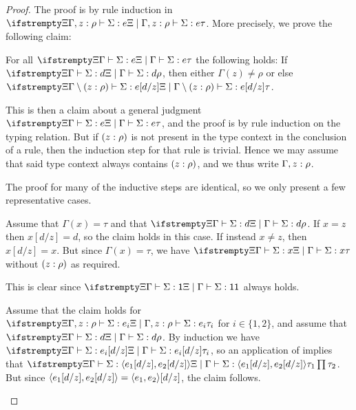 \begin{proof}
The proof is by rule induction in $\typerel{\Xi}{\Gamma, \hastype{z}{\rho}}{\Sigma}{e}{\tau}$. More precisely, we prove the following claim:
%
\begin{displaytheorem}
    For all $\typerel{\Xi}{\Gamma}{\Sigma}{e}{\tau}$ the following holds: If $\typerel{\Xi}{\Gamma}{\Sigma}{d}{\rho}$, then either $\Gamma(z) \neq \rho$ or else $\typerel{\Xi}{\Gamma \setminus \hastype*{z}{\rho}}{\Sigma}{e[d/z]}{\tau}$.
\end{displaytheorem}
%
This is then a claim about a general judgment $\typerel{\Xi}{\Gamma}{\Sigma}{e}{\tau}$, and the proof is by rule induction on the typing relation. But if $\hastype*{z}{\rho}$ is not present in the type context in the conclusion of a rule, then the induction step for that rule is trivial. Hence we may assume that said type context always contains $\hastype*{z}{\rho}$, and we thus write $\Gamma, \hastype{z}{\rho}$.

The proof for many of the inductive steps are identical, so we only present a few representative cases.
%
\begin{proofsec}
    \item[\ruleref{Tvar}]
    Assume that $\Gamma(x) = \tau$ and that $\typerel{\Xi}{\Gamma}{\Sigma}{d}{\rho}$. If $x = z$ then $x[d/z] = d$, so the claim holds in this case. If instead $x \neq z$, then $x[d/z] = x$. But since $\Gamma(x) = \tau$, we have $\typerel{\Xi}{\Gamma}{\Sigma}{x}{\tau}$ without $\hastype*{z}{\rho}$ as required.

    \item[\ruleref{Tunit}]
    This is clear since $\typerel{\Xi}{\Gamma}{\Sigma}{\expUnit}{\typeUnit}$ always holds.

    \item[\ruleref{Tpair}]
    Assume that the claim holds for $\typerel{\Xi}{\Gamma, \hastype{z}{\rho}}{\Sigma}{e_i}{\tau_i}$ for $i \in \{1,2\}$, and assume that $\typerel{\Xi}{\Gamma}{\Sigma}{d}{\rho}$. By induction we have $\typerel{\Xi}{\Gamma}{\Sigma}{e_i[d/z]}{\tau_i}$, so an application of  implies that $\typerel{\Xi}{\Gamma}{\Sigma}{\expPair{e_1[d/z]}{e_2[d/z]}}{\typeProd{\tau_1}{\tau_2}}$. But since $\langle\textcolor{black}{e_1[d/z]},\textcolor{black}{e_2[d/z]}\rangle = \langle\textcolor{black}{e_1},\textcolor{black}{e_2}\rangle[d/z]$, the claim follows.


\end{proofsec}
\end{proof}
